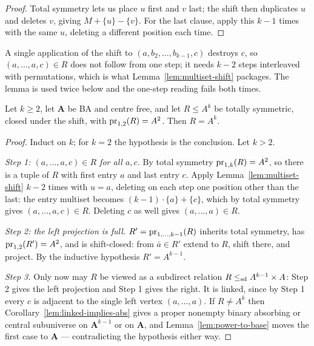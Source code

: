 \begin{proof}
Total symmetry lets us place $u$ first and $v$ last; the shift then duplicates
$u$ and deletes $v$, giving $M+\{u\}-\{v\}$. For the last clause, apply this
$k-1$ times with the same $u$, deleting a different position each time.
\end{proof}

\begin{hazard}\label{haz:shift}
A single application of the shift to $(a,b_{2},\dots,b_{k-1},c)$ destroys $c$,
so $(a,\dots,a,c)\in R$ does not follow from one step; it needs $k-2$ steps
interleaved with permutations, which is what Lemma~\ref{lem:multiset-shift}
packages. The lemma is used twice below and the one-step reading fails both
times.
\end{hazard}

\begin{lemma}\label{lem:tot-sym-full}
Let $k\ge2$, let $\mathbf A$ be BA and centre free, and let $R\le A^{k}$ be
totally symmetric, closed under the shift, with $\operatorname*{pr}_{1,2}(R)=A^{2}$. Then
$R=A^{k}$.
\end{lemma}

\begin{proof}
Induct on $k$; for $k=2$ the hypothesis is the conclusion. Let $k>2$.

\emph{Step 1: $(a,\dots,a,c)\in R$ for all $a,c$.} By total symmetry
$\operatorname*{pr}_{1,k}(R)=A^{2}$, so there is a tuple of $R$ with first entry $a$ and
last entry $c$. Apply Lemma~\ref{lem:multiset-shift} $k-2$ times with $u=a$,
deleting on each step one position other than the last: the entry multiset
becomes $(k-1)\cdot\{a\}+\{c\}$, which by total symmetry gives
$(a,\dots,a,c)\in R$. Deleting $c$ as well gives $(a,\dots,a)\in R$.

\emph{Step 2: the left projection is full.} $R'=\operatorname*{pr}_{1,\dots,k-1}(R)$
inherits total symmetry, has $\operatorname*{pr}_{1,2}(R')=A^{2}$, and is shift-closed: from
$\bar a\in R'$ extend to $R$, shift there, and project. By the inductive
hypothesis $R'=A^{k-1}$.

\emph{Step 3.} Only now may $R$ be viewed as a subdirect relation
$R\le_{\mathrm{sd}} A^{k-1}\times A$: Step 2 gives the left projection and Step 1 gives the
right. It is linked, since by Step 1 every $c$ is adjacent to the single left
vertex $(a,\dots,a)$. If $R\neq A^{k}$ then
Corollary~\ref{lem:linked-implies-abs} gives a proper nonempty binary
absorbing or central subuniverse on $\mathbf A^{k-1}$ or on $\mathbf A$, and
Lemma~\ref{lem:power-to-base} moves the first case to $\mathbf A$ ---
contradicting the hypothesis either way.
\end{proof}

